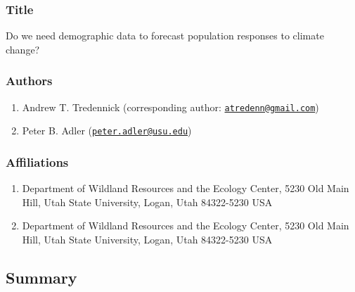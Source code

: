 \documentclass[12pt,]{article}
\title{}
\author{}
\date{}
\begin{document}
\maketitle


\subsubsection{Title}\label{title}

Do we need demographic data to forecast population responses to climate
change?

\subsubsection{Authors}\label{authors}

\begin{enumerate}
\def\labelenumi{\arabic{enumi}.}
\itemsep1pt\parskip0pt
\item
  Andrew T. Tredennick (corresponding author:
  \href{mailto:atredenn@gmail.com}{\nolinkurl{atredenn@gmail.com}})
\item
  Peter B. Adler
  (\href{mailto:peter.adler@usu.edu}{\nolinkurl{peter.adler@usu.edu}})
\end{enumerate}

\subsubsection{Affiliations}\label{affiliations}

\begin{enumerate}
\def\labelenumi{\arabic{enumi}.}
\itemsep1pt\parskip0pt
\item
  Department of Wildland Resources and the Ecology Center, 5230 Old Main
  Hill, Utah State University, Logan, Utah 84322-5230 USA
\item
  Department of Wildland Resources and the Ecology Center, 5230 Old Main
  Hill, Utah State University, Logan, Utah 84322-5230 USA
\end{enumerate}

\newpage{}

\subsection{Summary}\label{summary}
\end{document}
